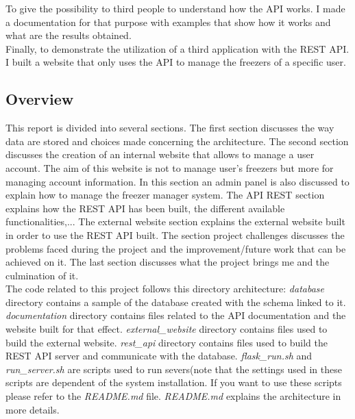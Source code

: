 To give the possibility to third people to understand how the API works. I made a documentation for that purpose with examples that show how it works and what are the results obtained. \\

Finally, to demonstrate the utilization of a third application with the REST API. I built a website that only uses the API to manage the freezers of a specific user.\\

\subsection{Overview}
This report is divided into several sections. The first section discusses the way data are stored and choices made concerning the architecture. The second section discusses the creation of an internal website that allows to manage a user account. The aim of this website is not to manage user's freezers but more for managing account information. In this section an admin panel is also discussed to explain how to manage the freezer manager system. The API REST section explains how the REST API has been built, the different available functionalities,... The external website section explains the external website built in order to use the REST API built. The section project challenges discusses the problems faced during the project and the improvement/future work that can be achieved on it. The last section discusses what the project brings me and the culmination of it.\\

The code related to this project follows this directory architecture:
\textit{database} directory contains a sample of the database created with the schema linked to it. \textit{documentation} directory contains files related to the API documentation and the website built for that effect. \textit{external\_website} directory contains files used to build the external website. \textit{rest\_api} directory contains files used to build the REST API server and communicate with the database. \textit{flask\_run.sh} and \textit{run\_server.sh} are scripts used to run severs(note that the settings used in these scripts are dependent of the system installation. If you want to use these scripts please refer to the \textit{README.md} file. \textit{README.md} explains the architecture in more details.


